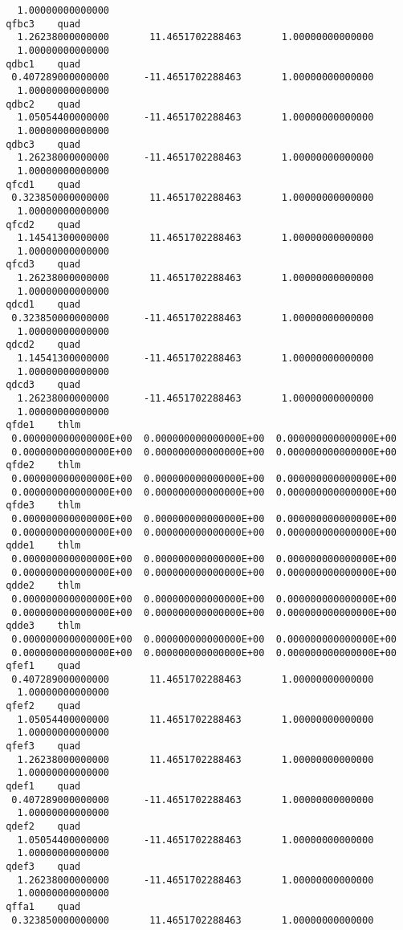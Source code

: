 \begin{footnotesize}
\begin{verbatim}
   1.00000000000000
 qfbc3    quad
   1.26238000000000       11.4651702288463       1.00000000000000
   1.00000000000000
 qdbc1    quad
  0.407289000000000      -11.4651702288463       1.00000000000000
   1.00000000000000
 qdbc2    quad
   1.05054400000000      -11.4651702288463       1.00000000000000
   1.00000000000000
 qdbc3    quad
   1.26238000000000      -11.4651702288463       1.00000000000000
   1.00000000000000
 qfcd1    quad
  0.323850000000000       11.4651702288463       1.00000000000000
   1.00000000000000
 qfcd2    quad
   1.14541300000000       11.4651702288463       1.00000000000000
   1.00000000000000
 qfcd3    quad
   1.26238000000000       11.4651702288463       1.00000000000000
   1.00000000000000
 qdcd1    quad
  0.323850000000000      -11.4651702288463       1.00000000000000
   1.00000000000000
 qdcd2    quad
   1.14541300000000      -11.4651702288463       1.00000000000000
   1.00000000000000
 qdcd3    quad
   1.26238000000000      -11.4651702288463       1.00000000000000
   1.00000000000000
 qfde1    thlm
  0.000000000000000E+00  0.000000000000000E+00  0.000000000000000E+00
  0.000000000000000E+00  0.000000000000000E+00  0.000000000000000E+00
 qfde2    thlm
  0.000000000000000E+00  0.000000000000000E+00  0.000000000000000E+00
  0.000000000000000E+00  0.000000000000000E+00  0.000000000000000E+00
 qfde3    thlm
  0.000000000000000E+00  0.000000000000000E+00  0.000000000000000E+00
  0.000000000000000E+00  0.000000000000000E+00  0.000000000000000E+00
 qdde1    thlm
  0.000000000000000E+00  0.000000000000000E+00  0.000000000000000E+00
  0.000000000000000E+00  0.000000000000000E+00  0.000000000000000E+00
 qdde2    thlm
  0.000000000000000E+00  0.000000000000000E+00  0.000000000000000E+00
  0.000000000000000E+00  0.000000000000000E+00  0.000000000000000E+00
 qdde3    thlm
  0.000000000000000E+00  0.000000000000000E+00  0.000000000000000E+00
  0.000000000000000E+00  0.000000000000000E+00  0.000000000000000E+00
 qfef1    quad
  0.407289000000000       11.4651702288463       1.00000000000000
   1.00000000000000
 qfef2    quad
   1.05054400000000       11.4651702288463       1.00000000000000
   1.00000000000000
 qfef3    quad
   1.26238000000000       11.4651702288463       1.00000000000000
   1.00000000000000
 qdef1    quad
  0.407289000000000      -11.4651702288463       1.00000000000000
   1.00000000000000
 qdef2    quad
   1.05054400000000      -11.4651702288463       1.00000000000000
   1.00000000000000
 qdef3    quad
   1.26238000000000      -11.4651702288463       1.00000000000000
   1.00000000000000
 qffa1    quad
  0.323850000000000       11.4651702288463       1.00000000000000

\end{verbatim}
\end{footnotesize}
